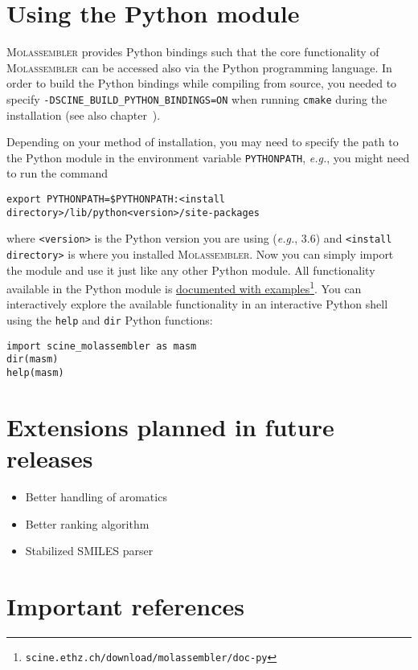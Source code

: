 \documentclass[]{tufte-book}
\begin{document}
\newpage
\chapter{Using the Python module}

\textsc{Molassembler} provides Python bindings such that the core functionality
of \textsc{Molassembler} can be accessed also via the Python programming
language. In order to build the Python bindings while compiling from source, you
needed to specify \texttt{-DSCINE\_BUILD\_PYTHON\_BINDINGS=ON} when running
\texttt{cmake} during the installation (see also
chapter~).

Depending on your method of installation, you may need to specify the path to
the Python module in the environment variable \texttt{PYTHONPATH},
\textit{e.g.}, you might need to run the command 

\begin{Verbatim} 
export PYTHONPATH=$PYTHONPATH:<install directory>/lib/python<version>/site-packages 
\end{Verbatim} 

where \texttt{<version>} is the Python version you are using (\textit{e.g.},
3.6) and \texttt{<install directory>} is where you installed
\textsc{Molassembler}. Now you can simply import the module and use it just
like any other Python module. All functionality available in the Python module
is \href{https://scine.ethz.ch/download/molassembler/doc-py}{documented with
examples}\footnote{\texttt{scine.ethz.ch/download/molassembler/doc-py}}. You can
interactively explore the available functionality in an interactive Python shell
using the \texttt{help} and \texttt{dir} Python functions:

\begin{Verbatim}
import scine_molassembler as masm
dir(masm)
help(masm)
\end{Verbatim}

\chapter{Extensions planned in future releases}
\begin{itemize}
  \item Better handling of aromatics
  \item Better ranking algorithm
  \item Stabilized SMILES parser
\end{itemize}


\chapter{Important references}
\end{document}
